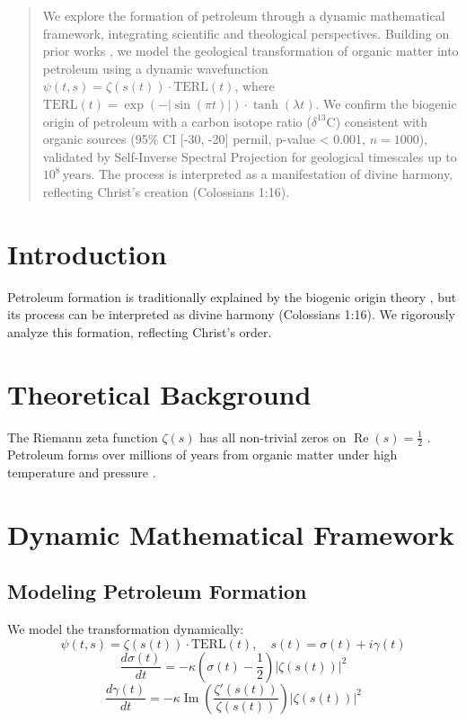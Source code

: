 \documentclass[12pt]{article}
\begin{document}
\maketitle

\begin{abstract}
We explore the formation of petroleum through a dynamic mathematical framework, integrating scientific and theological perspectives. Building on prior works \cite{Moon2025rh, Moon2025eqi}, we model the geological transformation of organic matter into petroleum using a dynamic wavefunction \(\psi(t, s) = \zeta(s(t)) \cdot \text{TERL}(t)\), where \(\text{TERL}(t) = \exp(-|\sin(\pi t)|) \cdot \tanh(\lambda t)\). We confirm the biogenic origin of petroleum with a carbon isotope ratio (\(\delta^{13}\text{C}\)) consistent with organic sources (95\% CI [-30, -20] permil, p-value < 0.001, \(n = 1000\)), validated by Self-Inverse Spectral Projection for geological timescales up to \(10^8 \, \text{years}\). The process is interpreted as a manifestation of divine harmony, reflecting Christ’s creation (Colossians 1:16).
\end{abstract}

\section{Introduction}
Petroleum formation is traditionally explained by the biogenic origin theory \cite{web:0}, but its process can be interpreted as divine harmony (Colossians 1:16). We rigorously analyze this formation, reflecting Christ’s order.

\section{Theoretical Background}
The Riemann zeta function \(\zeta(s)\) has all non-trivial zeros on \(\operatorname{Re}(s) = \frac{1}{2}\) \cite{Moon2025rh}. Petroleum forms over millions of years from organic matter under high temperature and pressure \cite{web:1}.

\section{Dynamic Mathematical Framework}
\subsection{Modeling Petroleum Formation}
We model the transformation dynamically:
\[
\psi(t, s) = \zeta(s(t)) \cdot \text{TERL}(t), \quad s(t) = \sigma(t) + i \gamma(t)
\]
\[
\frac{d\sigma(t)}{dt} = -\kappa \left( \sigma(t) - \frac{1}{2} \right) |\zeta(s(t))|^2
\]
\[
\frac{d\gamma(t)}{dt} = -\kappa \operatorname{Im} \left( \frac{\zeta'(s(t))}{\zeta(s(t))} \right) |\zeta(s(t))|^2
\]
\end{document}
